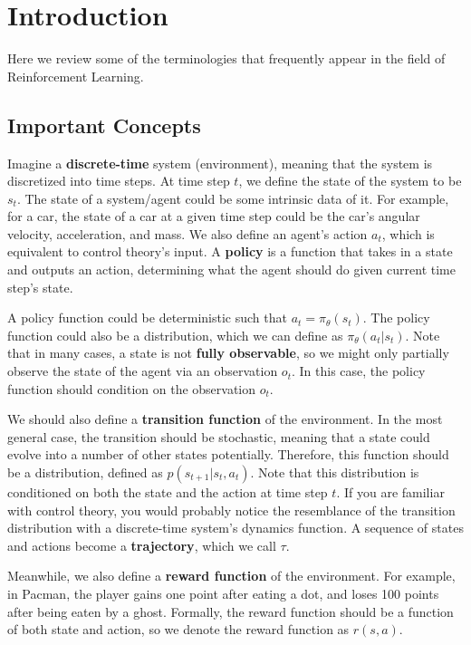 \chapter{Introduction}

Here we review some of the terminologies that frequently appear in the field of Reinforcement Learning.
\section{Important Concepts}
Imagine a \textbf{discrete-time} system (environment), meaning that the system is discretized into time steps. At time step $t$, we define the state of the system to be $s_t$. The state of a system/agent could be some intrinsic data of it. For example, for a car, the state of a car at a given time step could be the car's angular velocity, acceleration, and mass. We also define an agent's action $a_t$, which is equivalent to control theory's input. A \textbf{policy} is a function that takes in a state and outputs an action, determining what the agent should do given current time step's state. 

A policy function could be deterministic such that $a_t = \pi_\theta(s_t)$. The policy function could also be a distribution, which we can define as $\pi_\theta(a_t|s_t)$. Note that in many cases, a state is not \textbf{fully observable}, so we might only partially observe the state of the agent via an observation $o_t$. In this case, the policy function should condition on the observation $o_t$. 

We should also define a \textbf{transition function} of the environment. In the most general case, the transition should be stochastic, meaning that a state could evolve into a number of other states potentially. Therefore, this function should be a distribution, defined as $p(s_{t+1}|s_t, a_t)$. Note that this distribution is conditioned on both the state and the action at time step $t$. If you are familiar with control theory, you would probably notice the resemblance of the transition distribution with a discrete-time system's dynamics function. A sequence of states and actions become a \textbf{trajectory}, which we call $\tau$.

Meanwhile, we also define a \textbf{reward function} of the environment. For example, in Pacman, the player gains one point after eating a dot, and loses 100 points after being eaten by a ghost. Formally, the reward function should be a function of both state and action, so we denote the reward function as $r(s,a)$.

